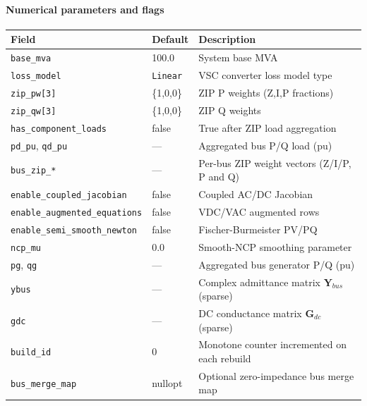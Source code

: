 \paragraph{Numerical parameters and flags}
\begin{longtable}{lll}
\hline\hline
\textbf{Field} & \textbf{Default} & \textbf{Description} \\
\hline\endhead\hline\endfoot
\texttt{base\_mva} & 100.0 & System base MVA \\
\texttt{loss\_model} & \texttt{Linear} & VSC converter loss model type \\
\texttt{zip\_pw[3]} & \{1,0,0\} & ZIP P weights (Z,I,P fractions) \\
\texttt{zip\_qw[3]} & \{1,0,0\} & ZIP Q weights \\
\texttt{has\_component\_loads} & false & True after ZIP load aggregation \\
\texttt{pd\_pu}, \texttt{qd\_pu} & --- & Aggregated bus P/Q load (pu) \\
\texttt{bus\_zip\_*} & --- & Per-bus ZIP weight vectors (Z/I/P, P and Q) \\
\texttt{enable\_coupled\_jacobian} & false & Coupled AC/DC Jacobian \\
\texttt{enable\_augmented\_equations} & false & VDC/VAC augmented rows \\
\texttt{enable\_semi\_smooth\_newton} & false & Fischer-Burmeister PV/PQ \\
\texttt{ncp\_mu} & 0.0 & Smooth-NCP smoothing parameter \\
\texttt{pg}, \texttt{qg} & --- & Aggregated bus generator P/Q (pu) \\
\texttt{ybus} & --- & Complex admittance matrix \(\mathbf{Y}_{bus}\) (sparse) \\
\texttt{gdc} & --- & DC conductance matrix \(\mathbf{G}_{dc}\) (sparse) \\
\texttt{build\_id} & 0 & Monotone counter incremented on each rebuild \\
\texttt{bus\_merge\_map} & nullopt & Optional zero-impedance bus merge map \\
\end{longtable}


